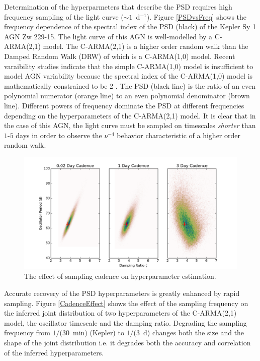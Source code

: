 Determination of the hyperparmeters that describe the PSD requires high frequency
sampling of the light curve ($\sim 1$~d$^{-1}$). Figure \ref{PSDvsFreq} shows
the frequency dependence of the spectral index of the PSD (black) of the Kepler Sy 1 AGN 
Zw 229-15. The light curve of this AGN is well-modelled by a C-ARMA(2,1) 
model. The C-ARMA(2,1) is a higher order random walk than the 
Damped Random Walk (DRW) of \citet{Kelly09} which is a C-ARMA(1,0)
 model. Recent varaibility studies indicate that the simple C-ARMA(1,0) 
model is insufficient to model AGN variability because the spectral
 index of the C-ARMA(1,0)
model is mathematically constrained to be 2 \citep{Kelly14,Kasliwal15,Simm15}. 
The PSD (black line) is the ratio of an even polynomial numerator (orange line) to 
an even polynomial denominator (brown line). Different powers of frequency dominate
the PSD at different frequencies depending on the hyperparameters of the C-ARMA(2,1) model. It is
clear that in the case of this AGN, the light curve must be sampled on timescales {\em shorter} than 
$1$-$5$ days in order to observe the $\nu^{-4}$ behavior characteristic of a higher order random walk.

\begin{figure}
\includegraphics[width=5.0in]{figs/agn/AGN_Variability_00.png}
\caption{The effect of sampling cadence on hyperparameter estimation.}
\label{CadenceEffec}
\end{figure}

Accurate recovery of the PSD hyperparameters is greatly enhanced by rapid sampling. Figure \ref{CadenceEffect}
shows the effect of the sampling frequency on the inferred joint distribution of two
 hyperparameters of the C-ARMA(2,1) model, the 
oscillator timescale and the damping ratio. Degrading the sampling frequency from $1/$($30$~min) 
(Kepler) to $1/$($3$~d) changes both the size and the shape of the joint distribution i.e. it degrades both 
the accuracy and correlation of the inferred hyperparameters. 

